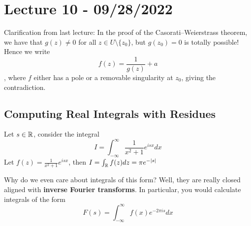 \section{Lecture 10 - 09/28/2022}

Clarification from last lecture: In the proof of the Casorati–Weierstrass theorem, we have that $g(z) \neq 0$ for all $z \in U\setminus \{z_0\}$, but $g(z_0) = 0$ is totally possible! Hence we write
\[f(z) = \frac{1}{g(z)} + a\]
, where $f$ either has a pole or a removable singularity at $z_0$, giving the contradiction.

\subsection{Computing Real Integrals with Residues}

\begin{example}
Let $s \in \mathbb{R}$, consider the integral
\[I = \int_{-\infty}^\infty \frac{1}{x^2 + 1} e^{isx} dx\]
Let $f(z) = \frac{1}{x^2 + 1} e^{isx}$, then $I = \int_{\mathbb{R}} f(z) dz = \pi e^{-|s|}$
\end{example}

\begin{remark}
Why do we even care about integrals of this form? Well, they are really closed aligned with \textbf{inverse Fourier transforms}. In particular, you would calculate integrals of the form
\[F(s) = \int_{-\infty}^\infty f(x) e^{-2\pi i s} dx\]
\end{remark}

